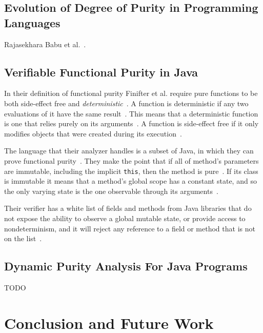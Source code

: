 \documentclass[a4paper,12pt]{article}
\begin{document}
\subsection{Evolution of Degree of Purity in Programming Languages} \label{sub:Evolution of Degree of Purity in Programming Languages}
Rajasekhara Babu et al.~\cite{rajasekharababu2012evolution}.

\subsection{Verifiable Functional Purity in Java} \label{sub:Verifiable-Functional-Purity-in-Java}
In their definition of functional purity Finifter et al. require pure functions to be both side-effect free and \textit{deterministic}~\cite{purity-in-java}. A function is deterministic if any two evaluations of it have the same result~\cite{purity-in-java}. This means that a deterministic function is one that relies purely on its arguments~\cite{purity-in-java}. A function is side-effect free if it only modifies objects that were created during its execution~\cite{purity-in-java}.

The language that their analyzer handles is a subset of Java, in which they can prove functional purity~\cite{purity-in-java}. They make the point that if all of method's parameters are immutable, including the implicit \texttt{this}, then the method is pure~\cite{purity-in-java}. %
If its class is immutable it means that a method's global scope has a constant state, and so the only varying state is the one observable through its arguments~\cite{purity-in-java}.

Their verifier has a white list of fields and methods from Java libraries that do not expose the ability to observe a global mutable state, or provide access to nondeterminism, and it will reject any reference to a field or method that is not on the list~\cite{purity-in-java}.

\subsection{Dynamic Purity Analysis For Java Programs} \label{sub:Dynamic Purity Analysis For Java Programs}
\cite{xu2007dynamic} TODO

\section{Conclusion and Future Work} \label{sec:Conclusion and future Work} %
\end{document}

